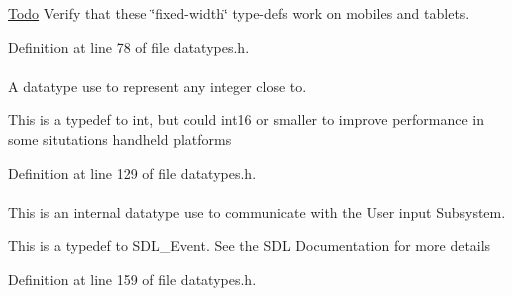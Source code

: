 \begin{Desc}
\item[\hyperlink{todo__todo000010}{Todo}]Verify that these \char`\"{}fixed-\/width\char`\"{} type-\/defs work on mobiles and tablets.\end{Desc}


Definition at line 78 of file datatypes.h.

\hypertarget{namespaceMezzanine_ac3576e52af3c62d13dde94829e0c5465}{
\paragraph[{Integer}]{}\hfill}
\label{namespaceMezzanine_ac3576e52af3c62d13dde94829e0c5465}


A datatype use to represent any integer close to. 

This is a typedef to int, but could int16 or smaller to improve performance in some situtations handheld platforms 

Definition at line 129 of file datatypes.h.

\hypertarget{namespaceMezzanine_ae8d4c0ab783af89a250b0225b75753e5}{
\paragraph[{RawEvent}]{}\hfill}
\label{namespaceMezzanine_ae8d4c0ab783af89a250b0225b75753e5}


This is an internal datatype use to communicate with the User input Subsystem. 

This is a typedef to SDL\_\-Event. See the SDL Documentation for more details 

Definition at line 159 of file datatypes.h.

\hypertarget{namespaceMezzanine_a726731b1a7df72bf3583e4a97282c6f6}{
\paragraph[{Real}]{}\hfill}
\label{namespaceMezzanine_a726731b1a7df72bf3583e4a97282c6f6}


